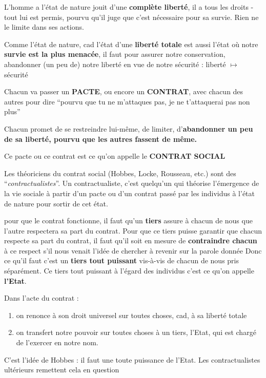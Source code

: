 \documentclass[
]{scrartcl}
\providecommand{\tightlist}{%
  \setlength{\itemsep}{0pt}\setlength{\parskip}{0pt}}
\begin{document}
L'homme a l'état de nature jouit d'une \textbf{complète liberté}, il a
tous les droits - tout lui est permis, pourvu qu'il juge que c'est
nécessaire pour sa survie. Rien ne le limite dans ses actions.

Comme l'état de nature, cad l'état d'une \textbf{liberté totale} est
aussi l'état où notre \textbf{survie est la plus menacée}, il faut pour
assurer notre conservation, abandonner (un peu de) notre liberté en vue
de notre sécurité : liberté \(\longmapsto\) sécurité

Chacun va passer un \textbf{PACTE}, ou encore un \textbf{CONTRAT}, avec
chacun des autres pour dire ``pourvu que tu ne m'attaques pas, je ne
t'attaquerai pas non plus''

Chacun promet de se restreindre lui-même, de limiter,
d'\textbf{abandonner un peu de sa liberté, pourvu que les autres fassent
de même.}

Ce pacte ou ce contrat est ce qu'on appelle le \textbf{CONTRAT SOCIAL}

Les théoriciens du contrat social (Hobbes, Locke, Rousseau, etc.) sont
des ``\emph{contractualistes}''. Un contractualiste, c'est quelqu'un qui
théorise l'émergence de la vie sociale à partir d'un pacte ou d'un
contrat passé par les individus à l'état de nature pour sortir de cet
état.

pour que le contrat fonctionne, il faut qu'un \textbf{tiers} assure à
chacun de nous que l'autre respectera sa part du contrat. Pour que ce
tiers puisse garantir que chacun respecte sa part du contrat, il faut
qu'il soit en mesure de \textbf{contraindre chacun} à ce respect s'il
nous venait l'idée de chercher à revenir sur la parole donnée Donc ce
qu'il faut c'est un \textbf{tiers tout puissant} vis-à-vis de chacun de
nous pris séparément. Ce tiers tout puissant à l'égard des individus
c'est ce qu'on appelle \textbf{l'Etat}.

Dans l'acte du contrat :

\begin{enumerate}
\def\labelenumi{\arabic{enumi}.}
\tightlist
\item
  on renonce à son droit universel sur toutes choses, cad, à sa liberté
  totale
\item
  on transfert notre pouvoir sur toutes choses à un tiers, l'Etat, qui
  est chargé de l'exercer en notre nom.
\end{enumerate}

C'est l'idée de Hobbes : il faut une toute puissance de l'Etat. Les
contractualistes ultérieurs remettent cela en question
\end{document}
